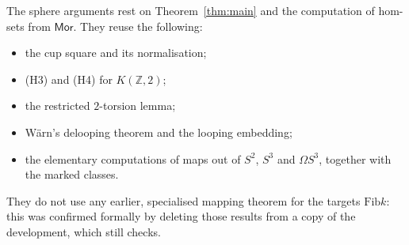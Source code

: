 \documentclass[11pt]{amsart}
\theoremstyle{definition}
\theoremstyle{remark}
\newcommand{\Om}{\Omega}
\newcommand{\Fib}{\mathrm{Fib}}
\newcommand{\Mor}{\mathsf{Mor}}
\newcommand{\Z}{\mathbb{Z}}
\begin{document}
The sphere arguments rest on Theorem~\ref{thm:main} and the computation of
hom-sets from $\Mor$. They reuse the following:
\begin{itemize}
\item the cup square and its normalisation;
\item (H3) and (H4) for $K(\Z,2)$;
\item the restricted $2$-torsion lemma;
\item Wärn's delooping theorem and the looping embedding;
\item the elementary computations of maps out of $S^2$, $S^3$ and $\Om S^3$,
together with the marked classes.
\end{itemize}
They do not use any earlier, specialised mapping theorem for the targets
$\Fib k$: this was confirmed formally by deleting those results from a copy of
the development, which still checks.
\end{document}
